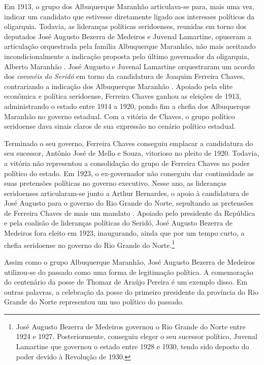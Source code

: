 \begin{refsection}
    Em 1913, o grupo dos Albuquerque Maranhão articulava-se para, mais uma vez, indicar um candidato que estivesse diretamente ligado aos interesses políticos da oligarquia. Todavia, as lideranças políticas seridoenses, reunidas em torno dos deputados José Augusto Bezerra de Medeiros e Juvenal Lamartine, opuseram a articulação orquestrada pela família Albuquerque Maranhão, não mais aceitando incondicionalmente a indicação proposta pelo último governador da oligarquia, Alberto Maranhão \cite[p.~208]{Macedo2012Penultima}. José Augusto e Juvenal Lamartine orquestraram um acordo dos \textit{coronéis do Seridó} em torno da candidatura de Joaquim Ferreira Chaves, contrariando a indicação dos Albuquerque Maranhão \cite[p.~208--209]{Macedo2012Penultima}. Apoiado pela elite econômica e política seridoense, Ferreira Chaves ganhou as eleições de 1913, administrando o estado entre 1914 a 1920, pondo fim a chefia dos Albuquerque Maranhão no governo estadual. Com a vitória de Chaves, o grupo político seridoense dava sinais claros de sua expressão no cenário político estadual.  

    Terminado o seu governo, Ferreira Chaves conseguiu emplacar a candidatura do seu sucessor, Antônio José de Mello e Souza, vitorioso no pleito de 1920. Todavia, a vitória não representou a consolidação do grupo de Ferreira Chaves no poder político do estado. Em 1923, o ex-governador não conseguiu dar continuidade as suas pretensões políticas no governo executivo. Nesse ano, as lideranças seridoenses articularam-se junto a Arthur Bernardes, o apoio à candidatura de José Augusto para o governo do Rio Grande do Norte, sepultando as pretensões de Ferreira Chaves de mais um mandato \cite[p.~20]{Spinelli1996Getulio}. Apoiado pelo presidente da República e pela coalisão de lideranças políticas do Seridó, José Augusto Bezerra de Medeiros fora eleito em 1923, inaugurando, ainda que por um tempo curto, a chefia seridoense no governo do Rio Grande do Norte.\footnote{José Augusto Bezerra de Medeiros governou o Rio Grande do Norte entre 1924 e 1927. Posteriormente, conseguiu eleger o seu sucessor político, Juvenal Lamartine que governou o estado entre 1928 e 1930, tendo sido deposto do poder devido à Revolução de 1930.}

    Assim como o grupo Albuquerque Maranhão, José Augusto Bezerra de Medeiros utilizou-se do passado como uma forma de legitimação política. A comemoração do centenário da posse de Thomaz de Araújo Pereira é um exemplo disso. Em outras palavras, a celebração da posse do primeiro presidente da província do Rio Grande do Norte representou um uso político do passado.


\end{refsection}
